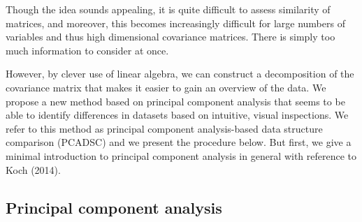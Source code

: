 \documentclass[titlepage,11pt,twoside]{article}
\begin{document}
Though the idea sounds appealing, it is quite difficult to assess similarity of matrices, and moreover, this becomes increasingly difficult for large numbers of variables and thus high dimensional covariance matrices. There is simply too much information to consider at once.

However, by clever use of linear algebra, we can construct a decomposition of the covariance matrix that makes it easier to gain an overview of the data. We propose a new method based on principal component analysis that seems to be able to identify differences in datasets based on intuitive, visual inspections. We refer to this method as principal component analysis-based data structure comparison (PCADSC) and we present the procedure below. But first, we give a minimal introduction to principal component analysis in general with reference to Koch (2014).


\subsection{Principal component analysis}
\end{document}
